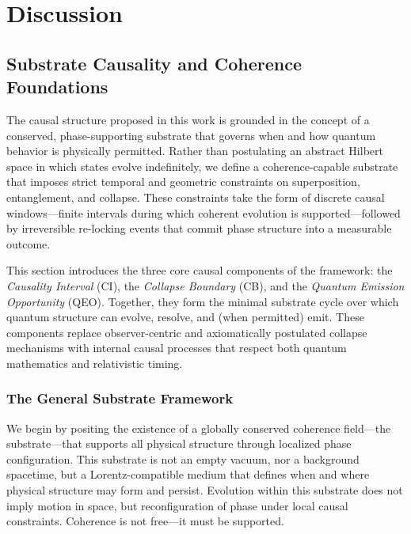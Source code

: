 \documentclass[preprints,article,submit,pdftex,moreauthors]{Definitions/mdpi}
\begin{document}

\section{Discussion}
\subsection{Substrate Causality and Coherence Foundations}
\label{sec:substratefoundation}

The causal structure proposed in this work is grounded in the concept of a conserved, phase-supporting substrate that governs when and how quantum behavior is physically permitted. Rather than postulating an abstract Hilbert space in which states evolve indefinitely, we define a coherence-capable substrate that imposes strict temporal and geometric constraints on superposition, entanglement, and collapse. These constraints take the form of discrete causal windows—finite intervals during which coherent evolution is supported—followed by irreversible re-locking events that commit phase structure into a measurable outcome.

This section introduces the three core causal components of the framework: the \textit{Causality Interval} (CI), the \textit{Collapse Boundary} (CB), and the \textit{Quantum Emission Opportunity} (QEO). Together, they form the minimal substrate cycle over which quantum structure can evolve, resolve, and (when permitted) emit. These components replace observer-centric and axiomatically postulated collapse mechanisms with internal causal processes that respect both quantum mathematics and relativistic timing.

\subsubsection{The General Substrate Framework}

We begin by positing the existence of a globally conserved coherence field—the substrate—that supports all physical structure through localized phase configuration. This substrate is not an empty vacuum, nor a background spacetime, but a Lorentz-compatible medium that defines when and where physical structure may form and persist. Evolution within this substrate does not imply motion in space, but reconfiguration of phase under local causal constraints. Coherence is not free—it must be supported.
\end{document}
